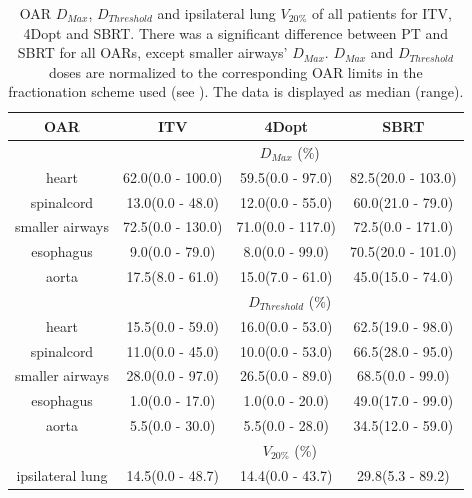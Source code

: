 \begin{table}[H]
	\centering
	\caption{OAR $D_{Max}$, $D_{Threshold}$ and ipsilateral lung $V_{20\%}$ of all patients for ITV, 4Dopt and SBRT. There was a significant difference between PT and SBRT for all OARs, except
	smaller airways' $D_{Max}$. $D_{Max}$ and $D_{Threshold}$ doses are normalized to the corresponding OAR limits in the fractionation scheme used (see \cite{Benedict2010}). 
	The data is displayed as median (range).}
	\begin{tabular}{c|c|c|c}
		\hline\hline
		 
		OAR &  ITV & 4Dopt & SBRT \\
		\hline
		& \multicolumn{3}{c}{$D_{Max}$ (\%)}  \\
		\hline
heart        & 62.0(0.0 - 100.0) & 59.5(0.0 - 97.0) & 82.5(20.0 - 103.0)\\ 
spinalcord    & 13.0(0.0 - 48.0) & 12.0(0.0 - 55.0) & 60.0(21.0 - 79.0)\\ 
smaller airways & 72.5(0.0 - 130.0) & 71.0(0.0 - 117.0) & 72.5(0.0 - 171.0)\\ 
esophagus      & 9.0(0.0 - 79.0) & 8.0(0.0 - 99.0) & 70.5(20.0 - 101.0)\\ 
aorta         & 17.5(8.0 - 61.0) & 15.0(7.0 - 61.0) & 45.0(15.0 - 74.0)\\ 
\hline\hline
& \multicolumn{3}{c}{$D_{Threshold}$ (\%)} \\
\hline
heart & 15.5(0.0 - 59.0) & 16.0(0.0 - 53.0) & 62.5(19.0 - 98.0)\\ 
spinalcord & 11.0(0.0 - 45.0) & 10.0(0.0 - 53.0) & 66.5(28.0 - 95.0)\\ 
smaller airways & 28.0(0.0 - 97.0) & 26.5(0.0 - 89.0) & 68.5(0.0 - 99.0)\\ 
esophagus & 1.0(0.0 - 17.0) & 1.0(0.0 - 20.0) & 49.0(17.0 - 99.0)\\ 
aorta & 5.5(0.0 - 30.0) & 5.5(0.0 - 28.0) & 34.5(12.0 - 59.0)\\ 
\hline\hline
& \multicolumn{3}{c}{$V_{20\%}$ (\%)} \\
\hline
ipsilateral lung & 14.5(0.0 - 48.7) & 14.4(0.0 - 43.7) & 29.8(5.3 - 89.2)\\ 
\hline\hline
	\end{tabular}
	\label{tab:OARComplex}
\end{table}

